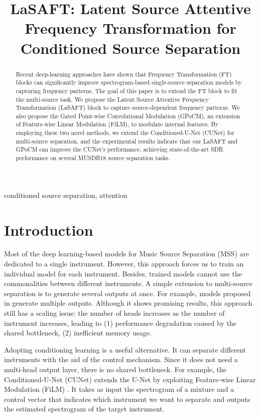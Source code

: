 \documentclass{article}
\title{LaSAFT: Latent Source Attentive Frequency Transformation for Conditioned Source Separation}
\begin{document}
\maketitle
\begin{abstract}

Recent deep-learning approaches have shown that Frequency Transformation (FT) blocks can significantly improve spectrogram-based single-source separation models by capturing frequency patterns. The goal of this paper is to extend the FT block to fit the multi-source task. We propose the Latent Source Attentive Frequency Transformation (LaSAFT) block to capture source-dependent frequency patterns. We also propose the Gated Point-wise Convolutional Modulation (GPoCM), an extension of Feature-wise Linear Modulation (FiLM), to modulate internal features. By employing these two novel methods, we extend the Conditioned-U-Net (CUNet) for multi-source separation, and the experimental results indicate that our LaSAFT and GPoCM can improve the CUNet's performance, achieving state-of-the-art SDR performance on several MUSDB18 source separation tasks.

\end{abstract}
\begin{keywords}
conditioned source separation, attention
\end{keywords}
\section{Introduction}
\label{sec:intro}



Most of the deep learning-based models for Music Source Separation (MSS) are dedicated to a single instrument.
However, this approach forces us to train an individual model for each instrument. Besides, trained models cannot use the commonalities between different instruments.
A simple extension to multi-source separation is to generate several outputs at once. For example, models proposed in \cite{dilatedlstm, d3net} generate multiple outputs.
Although it shows promising results, this approach still has a scaling issue: the number of heads increases as the number of instrument increases, leading to (1) performance degradation caused by the shared bottleneck, (2) inefficient memory usage.

Adopting conditioning learning \cite{cunet, meta} is a useful alternative. It can separate different instruments with the aid of the control mechanism. Since it does not need a multi-head output layer, there is no shared bottleneck.
For example, the Conditioned-U-Net (CUNet) \cite{cunet} extends the U-Net \cite{medical_unet, svs_unet} by exploiting Feature-wise Linear Modulation (FiLM) \cite{film}.
It takes as input the spectrogram of a mixture and a control vector that indicates which instrument we want to separate and outputs the estimated spectrogram of the target instrument.
\end{document}
